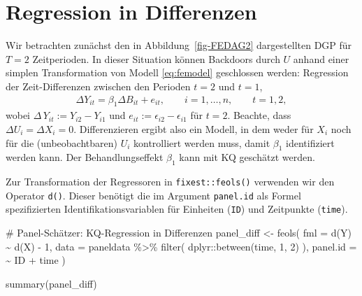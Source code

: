 \documentclass[
  a4paper,
  DIV=11,
  oneside]{scrreprt}
\newenvironment{Shaded}{\begin{snugshade}}{\end{snugshade}}
\newcommand{\AttributeTok}[1]{\textcolor[rgb]{0.40,0.45,0.13}{#1}}
\newcommand{\CommentTok}[1]{\textcolor[rgb]{0.37,0.37,0.37}{#1}}
\newcommand{\DecValTok}[1]{\textcolor[rgb]{0.68,0.00,0.00}{#1}}
\newcommand{\FunctionTok}[1]{\textcolor[rgb]{0.28,0.35,0.67}{#1}}
\newcommand{\NormalTok}[1]{\textcolor[rgb]{0.00,0.23,0.31}{#1}}
\newcommand{\OtherTok}[1]{\textcolor[rgb]{0.00,0.23,0.31}{#1}}
\newcommand{\SpecialCharTok}[1]{\textcolor[rgb]{0.37,0.37,0.37}{#1}}
\begin{document}
\section{Regression in Differenzen}\label{regression-in-differenzen}

Wir betrachten zunächst den in Abbildung~\ref{fig-FEDAG2} dargestellten
DGP für \(T=2\) Zeitperioden. In dieser Situation können Backdoors durch
\(U\) anhand einer simplen Transformation von Modell \eqref{eq:femodel}
geschlossen werden: Regression der Zeit-Differenzen zwischen den
Perioden \(t=2\) und \(t=1\), \begin{align}
  \Delta Y_{it} = \beta_1 \Delta B_{it} + e_{it}, \qquad i=1,\dots,n,\qquad t=1,2 \label{eq:femodeldiff},
\end{align} wobei \(\Delta\,Y_{it} := Y_{i2} - Y_{i1}\) und
\(e_{it} := \epsilon_{i2} - \epsilon_{i1}\) für \(t=2\). Beachte, dass
\(\Delta U_i=\Delta X_i=0\). Differenzieren ergibt also ein Modell, in
dem weder für \(X_i\) noch für die (unbeobachtbaren) \(U_i\)
kontrolliert werden muss, damit \(\beta_1\) identifiziert werden kann.
Der Behandlungseffekt \(\beta_1\) kann mit KQ geschätzt werden.

Zur Transformation der Regressoren in \texttt{fixest::feols()} verwenden
wir den Operator \texttt{d()}. Dieser benötigt die im Argument
\texttt{panel.id} als Formel spezifizierten Identifikationsvariablen für
Einheiten (\texttt{ID}) und Zeitpunkte (\texttt{time}).

\begin{Shaded}
\begin{Highlighting}[]
\CommentTok{\# Panel{-}Schätzer: KQ{-}Regression in Differenzen}
\NormalTok{panel\_diff }\OtherTok{\textless{}{-}} \FunctionTok{feols}\NormalTok{(}
  \AttributeTok{fml =} \FunctionTok{d}\NormalTok{(Y) }\SpecialCharTok{\textasciitilde{}} \FunctionTok{d}\NormalTok{(X) }\SpecialCharTok{{-}} \DecValTok{1}\NormalTok{, }
  \AttributeTok{data =}\NormalTok{ paneldata }\SpecialCharTok{\%\textgreater{}\%} 
      \FunctionTok{filter}\NormalTok{(}
\NormalTok{        dplyr}\SpecialCharTok{::}\FunctionTok{between}\NormalTok{(time, }\DecValTok{1}\NormalTok{, }\DecValTok{2}\NormalTok{)}
\NormalTok{      ),}
  \AttributeTok{panel.id =} \SpecialCharTok{\textasciitilde{}}\NormalTok{ ID }\SpecialCharTok{+}\NormalTok{ time}
\NormalTok{)}

\FunctionTok{summary}\NormalTok{(panel\_diff)}
\end{Highlighting}
\end{Shaded}
\end{document}
